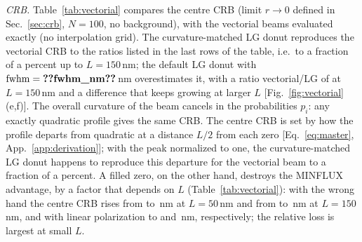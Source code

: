 \emph{CRB.} Table~\ref{tab:vectorial} compares the centre CRB (limit $r\to0$ defined in
Sec.~\ref{sec:crb}, $N=100$, no background), with the vectorial beams evaluated exactly (no interpolation grid). The
curvature-matched LG donut reproduces the vectorial CRB to the ratios listed in the last rows
of the table, i.e.\ to a fraction of a percent up to $L=150$\,nm; the default LG donut with
$\fwhm=\pnum{fwhm_nm}\src{fwhm_nm}$\,nm overestimates it, with a ratio vectorial/LG of
 at $L=150$\,nm and a
difference that keeps growing at larger $L$ [Fig.~\ref{fig:vectorial}(e,f)]. The overall
curvature of the beam cancels in the probabilities $p_i$: any exactly quadratic profile gives the
same CRB. The centre CRB is set by how the profile departs from quadratic at a distance $L/2$
from each zero [Eq.~\eqref{eq:master}, App.~\ref{app:derivation}]; with the peak normalized to
one, the curvature-matched LG donut happens to reproduce this departure for the vectorial beam
to a fraction of a percent. A filled zero, on the other hand, destroys the MINFLUX advantage, by
a factor that depends on $L$ (Table~\ref{tab:vectorial}): with the wrong hand the centre CRB
rises from  to
\,nm at
$L=50$\,nm and from 
to \,nm at
$L=150$\,nm, and with linear polarization to
 and
\,nm,
respectively; the relative loss is largest at small $L$.

